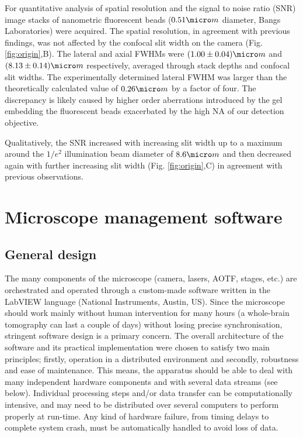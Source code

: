 \documentclass[12pt]{spieman}  %
\begin{document}
\begin{spacing}{2}
For quantitative analysis of spatial resolution and the signal to noise ratio (SNR) image stacks of nanometric fluorescent beads ($0.51 \micro m$ diameter, Bangs Laboratories) were acquired. The spatial resolution, in agreement with previous findings\cite{Wilson1987,Cox2004}, was not affected by the confocal slit width on the camera (Fig. \ref{fig:origin},B). The lateral and axial FWHMs were $(1.00\pm0.04) \micro m$ and $(8.13\pm0.14) \micro m$ respectively, averaged through stack depths and confocal slit widths. The experimentally determined lateral FWHM was larger than the theoretically calculated value of $0.26 \micro m$ by a factor of four. The discrepancy is likely caused by higher order aberrations introduced by the gel embedding the fluorescent beads exacerbated by the high NA of our detection objective\cite{Schwertner2004,Schwertner2007}.

Qualitatively, the SNR increased with increasing slit width up to a maximum around the $1/e^2$ illumination beam diameter of $8.6 \micro m$ and then decreased again with further increasing slit width (Fig. \ref{fig:origin},C) in agreement with previous observations\cite{Baumgart2012}.   

\section{Microscope management software}

\subsection{General design}
The many components of the microscope (camera, lasers, AOTF, stages, etc.) are orchestrated and operated through a custom-made software written in the LabVIEW language (National Instruments, Austin, US). Since the microscope should work mainly without human intervention for many hours (a whole-brain tomography can last a couple of days) without losing precise synchronisation, stringent software design is a primary concern. The overall architecture of the software and its practical implementation were chosen to satisfy two main principles; firstly, operation in a distributed environment and secondly, robustness and ease of maintenance. This means, the apparatus should be able to deal with many independent hardware components and with several data streams (see below). Individual processing steps and/or data transfer can be computationally intensive, and may need to be distributed over several computers to perform properly at run-time. Any kind of hardware failure, from timing delays to complete system crash, must be automatically handled to avoid loss of data.


\end{spacing}
\end{document}
